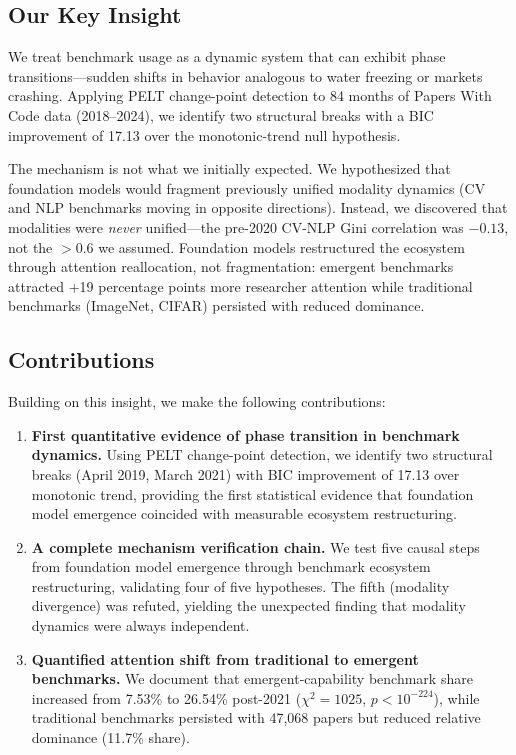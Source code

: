 \subsection{Our Key Insight}

We treat benchmark usage as a dynamic system that can exhibit phase transitions---sudden shifts in behavior analogous to water freezing or markets crashing. Applying PELT change-point detection to 84 months of Papers With Code data (2018--2024), we identify two structural breaks with a BIC improvement of 17.13 over the monotonic-trend null hypothesis.

The mechanism is not what we initially expected. We hypothesized that foundation models would fragment previously unified modality dynamics (CV and NLP benchmarks moving in opposite directions). Instead, we discovered that modalities were \emph{never} unified---the pre-2020 CV-NLP Gini correlation was $-0.13$, not the $>0.6$ we assumed. Foundation models restructured the ecosystem through attention reallocation, not fragmentation: emergent benchmarks attracted +19 percentage points more researcher attention while traditional benchmarks (ImageNet, CIFAR) persisted with reduced dominance.

\subsection{Contributions}

Building on this insight, we make the following contributions:

\begin{enumerate}
    \item \textbf{First quantitative evidence of phase transition in benchmark dynamics.} Using PELT change-point detection, we identify two structural breaks (April 2019, March 2021) with BIC improvement of 17.13 over monotonic trend, providing the first statistical evidence that foundation model emergence coincided with measurable ecosystem restructuring.

    \item \textbf{A complete mechanism verification chain.} We test five causal steps from foundation model emergence through benchmark ecosystem restructuring, validating four of five hypotheses. The fifth (modality divergence) was refuted, yielding the unexpected finding that modality dynamics were always independent.

    \item \textbf{Quantified attention shift from traditional to emergent benchmarks.} We document that emergent-capability benchmark share increased from 7.53\% to 26.54\% post-2021 ($\chi^2=1025$, $p<10^{-224}$), while traditional benchmarks persisted with 47,068 papers but reduced relative dominance (11.7\% share).
\end{enumerate}
